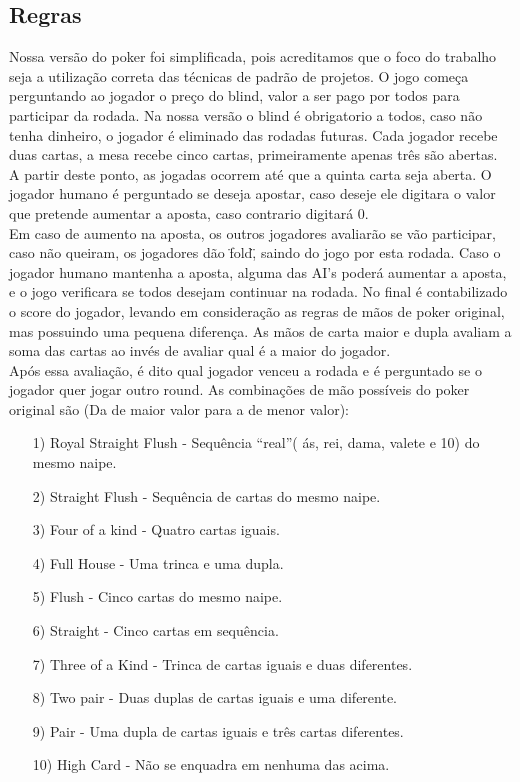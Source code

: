 \documentclass[12pt]{article}
\begin{document}
	\subsection{Regras}
        Nossa versão do poker foi simplificada, pois acreditamos que o foco do trabalho seja a utilização correta das
        técnicas de padrão de projetos.
        O jogo começa perguntando ao jogador o preço do blind, valor a ser pago por todos para participar da rodada. Na
        nossa versão o blind é obrigatorio a todos, caso não tenha dinheiro, o jogador é eliminado das rodadas futuras.
        Cada jogador recebe duas cartas, a mesa recebe cinco cartas, primeiramente apenas três são abertas.\\
        A partir deste ponto, as jogadas ocorrem até que a quinta carta seja aberta. O jogador humano é perguntado se
        deseja apostar, caso deseje ele digitara o valor que pretende aumentar a aposta, caso contrario digitará 0.\\
        Em caso de aumento na aposta, os outros jogadores avaliarão se vão participar, caso não queiram, os jogadores
        dão \"fold\", saindo do jogo por esta rodada.
        Caso o jogador humano mantenha a aposta, alguma das AI's poderá aumentar a aposta, e o jogo verificara se todos
        desejam continuar na rodada.
        No final é contabilizado o score do jogador, levando em consideração as regras de mãos de poker original, mas
        possuindo uma pequena diferença. As mãos de carta maior e dupla avaliam a soma das cartas ao invés de avaliar
        qual é a maior do jogador.\\
        Após essa avaliação, é dito qual jogador venceu a rodada e é perguntado se o jogador quer jogar outro round.
		As combinações de mão possíveis do poker original são (Da de maior valor para a de menor valor):
		\begin{enumerate}
			\item[1)]Royal Straight Flush - Sequência “real”( ás, rei, dama, valete e 10) do mesmo naipe.
			\item[2)]Straight Flush - Sequência de cartas do mesmo naipe.
			\item[3)]Four of a kind - Quatro cartas iguais.
			\item[4)]Full House - Uma trinca e uma dupla.
			\item[5)]Flush - Cinco cartas do mesmo naipe.
			\item[6)]Straight - Cinco cartas em sequência.
			\item[7)]Three of a Kind - Trinca de cartas iguais e duas diferentes.
			\item[8)]Two pair - Duas duplas de cartas iguais e uma diferente.
			\item[9)]Pair - Uma dupla de cartas iguais e três cartas diferentes.
			\item[10)]High Card - Não se enquadra em nenhuma das acima.
		\end{enumerate}
\end{document}
